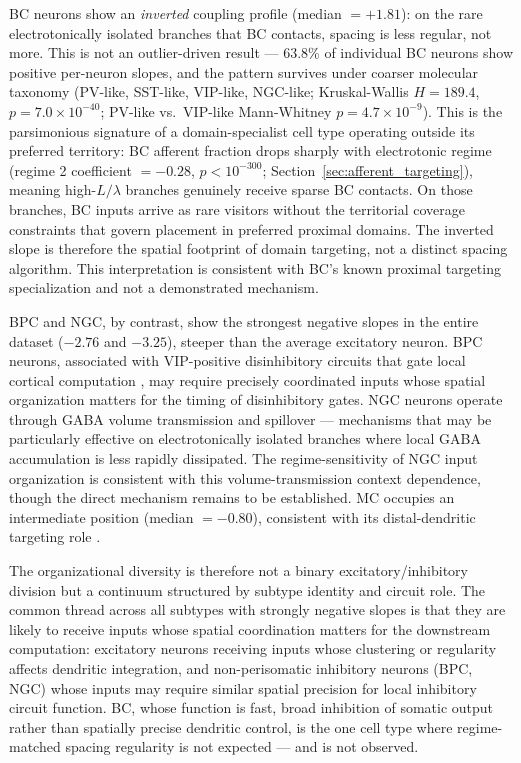 \documentclass[11pt]{article}
\begin{document}
BC neurons show an \textit{inverted} coupling profile (median $= +1.81$): on the rare electrotonically isolated branches that BC contacts, spacing is less regular, not more. This is not an outlier-driven result --- 63.8\% of individual BC neurons show positive per-neuron slopes, and the pattern survives under coarser molecular taxonomy (PV-like, SST-like, VIP-like, NGC-like; Kruskal-Wallis $H = 189.4$, $p = 7.0 \times 10^{-40}$; PV-like vs.\ VIP-like Mann-Whitney $p = 4.7 \times 10^{-9}$). This is the parsimonious signature of a domain-specialist cell type operating outside its preferred territory: BC afferent fraction drops sharply with electrotonic regime (regime 2 coefficient $= -0.28$, $p < 10^{-300}$; Section~\ref{sec:afferent_targeting}), meaning high-$L/\lambda$ branches genuinely receive sparse BC contacts. On those branches, BC inputs arrive as rare visitors without the territorial coverage constraints that govern placement in preferred proximal domains. The inverted slope is therefore the spatial footprint of domain targeting, not a distinct spacing algorithm. This interpretation is consistent with BC's known proximal targeting specialization \citep{schneider2023} and not a demonstrated mechanism.

BPC and NGC, by contrast, show the strongest negative slopes in the entire dataset ($-2.76$ and $-3.25$), steeper than the average excitatory neuron. BPC neurons, associated with VIP-positive disinhibitory circuits that gate local cortical computation \citep{pfeffer2013}, may require precisely coordinated inputs whose spatial organization matters for the timing of disinhibitory gates. NGC neurons operate through GABA volume transmission and spillover --- mechanisms that may be particularly effective on electrotonically isolated branches where local GABA accumulation is less rapidly dissipated. The regime-sensitivity of NGC input organization is consistent with this volume-transmission context dependence, though the direct mechanism remains to be established. MC occupies an intermediate position (median $= -0.80$), consistent with its distal-dendritic targeting role \citep{schneider2023}.

The organizational diversity is therefore not a binary excitatory/inhibitory division but a continuum structured by subtype identity and circuit role. The common thread across all subtypes with strongly negative slopes is that they are likely to receive inputs whose spatial coordination matters for the downstream computation: excitatory neurons receiving inputs whose clustering or regularity affects dendritic integration, and non-perisomatic inhibitory neurons (BPC, NGC) whose inputs may require similar spatial precision for local inhibitory circuit function. BC, whose function is fast, broad inhibition of somatic output rather than spatially precise dendritic control, is the one cell type where regime-matched spacing regularity is not expected --- and is not observed.
\end{document}

